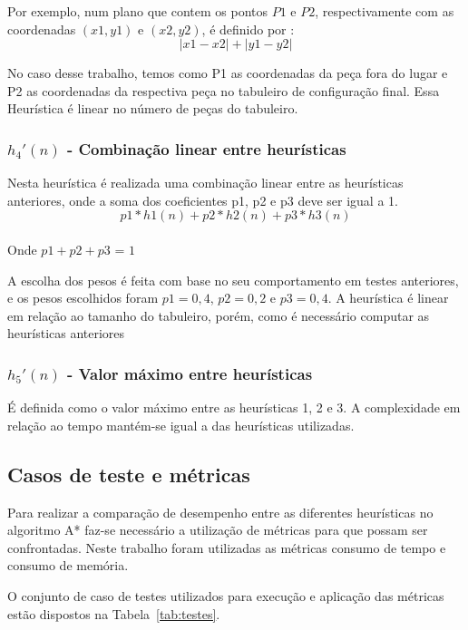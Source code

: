 \documentclass[12pt]{article}
\begin{document}
Por exemplo, num plano que contem os pontos $P1$ e $P2$, respectivamente com as coordenadas $(x1, y1)$ e $(x2, y2)$, é definido por : $$|x1 - x2| + |y1 - y2|$$

No caso desse trabalho, temos como P1 as coordenadas da peça fora do lugar e P2 as coordenadas da respectiva peça no tabuleiro de configuração final. Essa Heurística é linear no número de peças do tabuleiro.

\subsubsection{$h_{4}'(n)$ - \textbf{Combinação linear entre heurísticas}}

Nesta heurística é realizada uma combinação linear entre as heurísticas anteriores, onde a soma dos coeficientes p1, p2 e p3 deve ser igual a 1. $$p1 * h1(n) + p2 * h2(n) + p3 * h3(n)$$ \\ Onde $p1 + p2 + p3$ = $1$

A escolha dos pesos é feita com base no seu comportamento em testes anteriores, e os pesos escolhidos foram $p1 = 0,4$, $p2 = 0,2$ e $p3 = 0,4$. A heurística é linear em relação ao tamanho do tabuleiro, porém, como é necessário computar as heurísticas anteriores 

\subsubsection{$h_{5}'(n)$ - \textbf{Valor máximo entre heurísticas}}

É definida como o valor máximo entre as heurísticas 1, 2 e 3. A complexidade em relação ao tempo mantém-se igual a das heurísticas utilizadas.

\subsection{Casos de teste e métricas}\label{subsec:testmetricas}

Para realizar a comparação de desempenho entre as diferentes heurísticas no algoritmo A* faz-se necessário a utilização de métricas para que possam ser confrontadas. Neste trabalho foram utilizadas as métricas consumo de tempo e consumo de memória.

O conjunto de caso de testes utilizados para execução e aplicação das métricas estão dispostos na Tabela~\ref{tab:testes}.
\end{document}
